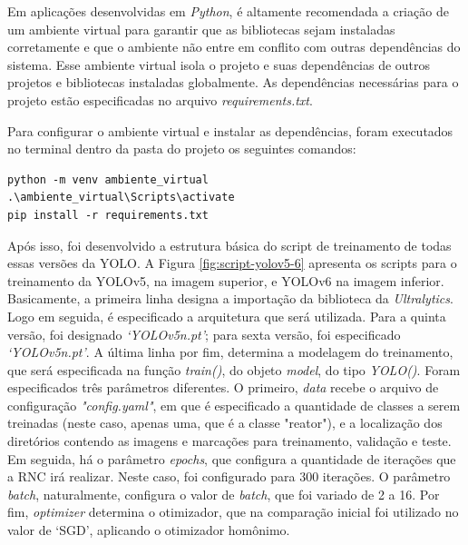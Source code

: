 Em aplicações desenvolvidas em \textit{Python}, é altamente recomendada a criação de um ambiente virtual para garantir que as bibliotecas sejam instaladas corretamente e que o ambiente não entre em conflito com outras dependências do sistema. Esse ambiente virtual isola o projeto e suas dependências de outros projetos e bibliotecas instaladas globalmente. As dependências necessárias para o projeto estão especificadas no arquivo \textit{requirements.txt}.

Para configurar o ambiente virtual e instalar as dependências, foram executados no terminal dentro da pasta do projeto os seguintes comandos:

\begin{lstlisting}
python -m venv ambiente_virtual
.\ambiente_virtual\Scripts\activate
pip install -r requirements.txt
\end{lstlisting}

Após isso, foi desenvolvido a estrutura básica do script de treinamento de todas essas versões da YOLO. A Figura \ref{fig:script-yolov5-6} apresenta os scripts para o treinamento da YOLOv5, na imagem superior, e YOLOv6 na imagem inferior. Basicamente, a primeira linha designa a importação da biblioteca da \textit{Ultralytics}. Logo em seguida, é especificado a arquitetura que será utilizada. Para a quinta versão, foi designado \textit{‘YOLOv5n.pt’}; para sexta versão, foi especificado \textit{‘YOLOv5n.pt’}. A última linha por fim, determina a modelagem do treinamento, que será especificada na função \textit{train()}, do objeto \textit{model}, do tipo \textit{YOLO()}. Foram especificados três parâmetros diferentes. O primeiro, \textit{data} recebe o arquivo de configuração \textit{"config.yaml"}, em que é especificado a quantidade de classes a serem treinadas (neste caso, apenas uma, que é a classe "reator"), e a localização dos diretórios contendo as imagens e marcações para treinamento, validação e teste. Em seguida, há o parâmetro \textit{epochs}, que configura a quantidade de iterações que a RNC irá realizar. Neste caso, foi configurado para 300 iterações. O parâmetro \textit{batch}, naturalmente, configura o valor de \textit{batch}, que foi variado de 2 a 16. Por fim, \textit{optimizer} determina o otimizador, que na comparação inicial foi utilizado no valor de ‘SGD’, aplicando o otimizador homônimo. 

